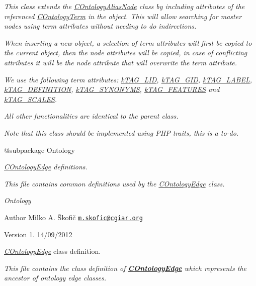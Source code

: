{\itshape }

{\itshape This class extends the \hyperlink{class_c_ontology_alias_node}{C\-Ontology\-Alias\-Node} class by including attributes of the referenced \hyperlink{class_c_ontology_term}{C\-Ontology\-Term} in the object. This will allow searching for master nodes using term attributes without needing to do indirections.}

{\itshape When inserting a new object, a selection of term attributes will first be copied to the current object, then the node attributes will be copied, in case of conflicting attributes it will be the node attribute that will overwrite the term attribute.}

{\itshape We use the following term attributes\-: \hyperlink{}{k\-T\-A\-G\-\_\-\-L\-I\-D}, \hyperlink{}{k\-T\-A\-G\-\_\-\-G\-I\-D}, \hyperlink{}{k\-T\-A\-G\-\_\-\-L\-A\-B\-E\-L}, \hyperlink{}{k\-T\-A\-G\-\_\-\-D\-E\-F\-I\-N\-I\-T\-I\-O\-N}, \hyperlink{}{k\-T\-A\-G\-\_\-\-S\-Y\-N\-O\-N\-Y\-M\-S}, \hyperlink{}{k\-T\-A\-G\-\_\-\-F\-E\-A\-T\-U\-R\-E\-S} and \hyperlink{}{k\-T\-A\-G\-\_\-\-S\-C\-A\-L\-E\-S}.}

{\itshape All other functionalities are identical to the parent class.}

{\itshape Note that this class should be implemented using P\-H\-P traits, this is a to-\/do.}

{\itshape \begin{DoxyVerb} @subpackage        Ontology\end{DoxyVerb}
}

{\itshape \hyperlink{class_c_ontology_edge}{C\-Ontology\-Edge} definitions.}

{\itshape This file contains common definitions used by the \hyperlink{class_c_ontology_edge}{C\-Ontology\-Edge} class.}

{\itshape  Ontology}

{\itshape \begin{DoxyAuthor}{Author}
Milko A. Škofič \href{mailto:m.skofic@cgiar.org}{\tt m.\-skofic@cgiar.\-org} 
\end{DoxyAuthor}
\begin{DoxyVersion}{Version}
1. 14/09/2012
\end{DoxyVersion}
{\itshape \hyperlink{class_c_ontology_edge}{C\-Ontology\-Edge}} class definition.}

{\itshape This file contains the class definition of {\bfseries \hyperlink{class_c_ontology_edge}{C\-Ontology\-Edge}} which represents the ancestor of ontology edge classes.}

